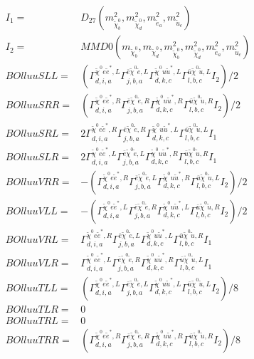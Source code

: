 \documentclass[A4,landscape]{article}
\begin{document}
\begin{align} 
I_1 = & D_{27}(m^2_{\tilde{\chi}^0_{{b}}}, m^2_{\tilde{\chi}^0_{{d}}}, m^2_{\tilde{e}_{{a}}}, m^2_{\tilde{u}_{{c}}}) \\ 
I_2 = & MMD0(m_{\tilde{\chi}^0_{{b}}}, m_{\tilde{\chi}^0_{{d}}}, m^2_{\tilde{\chi}^0_{{b}}}, m^2_{\tilde{\chi}^0_{{d}}}, m^2_{\tilde{e}_{{a}}}, m^2_{\tilde{u}_{{c}}}) \\ 
  BOlluuSLL= & ( \Gamma^{\tilde{\chi}^0 e \tilde{e}^*,L}_{d, i, a} \Gamma^{\bar{e}\tilde{\chi}^0 \tilde{e} ,L}_{j, b, a} \Gamma^{\tilde{\chi}^0 u \tilde{u}^*,L}_{d, k, c} \Gamma^{\bar{u}\tilde{\chi}^0 \tilde{u} ,L}_{l, b, c} I_2)/2 \\ 
  BOlluuSRR= & ( \Gamma^{\tilde{\chi}^0 e \tilde{e}^*,R}_{d, i, a} \Gamma^{\bar{e}\tilde{\chi}^0 \tilde{e} ,R}_{j, b, a} \Gamma^{\tilde{\chi}^0 u \tilde{u}^*,R}_{d, k, c} \Gamma^{\bar{u}\tilde{\chi}^0 \tilde{u} ,R}_{l, b, c} I_2)/2 \\ 
  BOlluuSRL= & 2  \Gamma^{\tilde{\chi}^0 e \tilde{e}^*,R}_{d, i, a} \Gamma^{\bar{e}\tilde{\chi}^0 \tilde{e} ,R}_{j, b, a} \Gamma^{\tilde{\chi}^0 u \tilde{u}^*,L}_{d, k, c} \Gamma^{\bar{u}\tilde{\chi}^0 \tilde{u} ,L}_{l, b, c} I_1 \\ 
  BOlluuSLR= & 2  \Gamma^{\tilde{\chi}^0 e \tilde{e}^*,L}_{d, i, a} \Gamma^{\bar{e}\tilde{\chi}^0 \tilde{e} ,L}_{j, b, a} \Gamma^{\tilde{\chi}^0 u \tilde{u}^*,R}_{d, k, c} \Gamma^{\bar{u}\tilde{\chi}^0 \tilde{u} ,R}_{l, b, c} I_1 \\ 
  BOlluuVRR= & -( \Gamma^{\tilde{\chi}^0 e \tilde{e}^*,R}_{d, i, a} \Gamma^{\bar{e}\tilde{\chi}^0 \tilde{e} ,L}_{j, b, a} \Gamma^{\tilde{\chi}^0 u \tilde{u}^*,R}_{d, k, c} \Gamma^{\bar{u}\tilde{\chi}^0 \tilde{u} ,L}_{l, b, c} I_2)/2 \\ 
  BOlluuVLL= & -( \Gamma^{\tilde{\chi}^0 e \tilde{e}^*,L}_{d, i, a} \Gamma^{\bar{e}\tilde{\chi}^0 \tilde{e} ,R}_{j, b, a} \Gamma^{\tilde{\chi}^0 u \tilde{u}^*,L}_{d, k, c} \Gamma^{\bar{u}\tilde{\chi}^0 \tilde{u} ,R}_{l, b, c} I_2)/2 \\ 
  BOlluuVRL= &  \Gamma^{\tilde{\chi}^0 e \tilde{e}^*,R}_{d, i, a} \Gamma^{\bar{e}\tilde{\chi}^0 \tilde{e} ,L}_{j, b, a} \Gamma^{\tilde{\chi}^0 u \tilde{u}^*,L}_{d, k, c} \Gamma^{\bar{u}\tilde{\chi}^0 \tilde{u} ,R}_{l, b, c} I_1 \\ 
  BOlluuVLR= &  \Gamma^{\tilde{\chi}^0 e \tilde{e}^*,L}_{d, i, a} \Gamma^{\bar{e}\tilde{\chi}^0 \tilde{e} ,R}_{j, b, a} \Gamma^{\tilde{\chi}^0 u \tilde{u}^*,R}_{d, k, c} \Gamma^{\bar{u}\tilde{\chi}^0 \tilde{u} ,L}_{l, b, c} I_1 \\ 
  BOlluuTLL= & ( \Gamma^{\tilde{\chi}^0 e \tilde{e}^*,L}_{d, i, a} \Gamma^{\bar{e}\tilde{\chi}^0 \tilde{e} ,L}_{j, b, a} \Gamma^{\tilde{\chi}^0 u \tilde{u}^*,L}_{d, k, c} \Gamma^{\bar{u}\tilde{\chi}^0 \tilde{u} ,L}_{l, b, c} I_2)/8 \\ 
  BOlluuTLR= & 0 \\ 
  BOlluuTRL= & 0 \\ 
  BOlluuTRR= & ( \Gamma^{\tilde{\chi}^0 e \tilde{e}^*,R}_{d, i, a} \Gamma^{\bar{e}\tilde{\chi}^0 \tilde{e} ,R}_{j, b, a} \Gamma^{\tilde{\chi}^0 u \tilde{u}^*,R}_{d, k, c} \Gamma^{\bar{u}\tilde{\chi}^0 \tilde{u} ,R}_{l, b, c} I_2)/8 \\ 
\end{align} 
\end{document}
